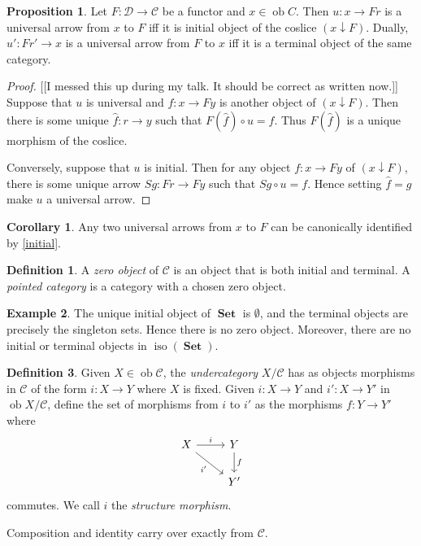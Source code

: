 \documentclass[10pt,letterpaper,cm]{nupset}
\theoremstyle{definition}
\newtheorem{definition}{Definition}
\newtheorem{exmp}[definition]{Example}
\theoremstyle{theorem}
\newtheorem{prop}[theorem]{Proposition}
\newtheorem{corollary}[theorem]{Corollary}
\theoremstyle{remark}
\newcommand{\1}{\mathbf{1}}
\renewcommand{\c}{\mathscr{C}}
\renewcommand{\d}{\mathscr{D}}
\newcommand{\0}{\vec 0}
\DeclareMathOperator{\ob}{ob}
\DeclareMathOperator{\iso}{iso}
\DeclareMathOperator{\set}{\mathbf{Set}}
\begin{document}
\begin{prop}
Let $F : \d \to \c$ be a functor and $x \in \ob C$. Then $u : x \to Fr$ is a universal arrow from $x$ to $F$ iff it is initial object of the coslice $(x \downarrow F)$. Dually, $u' : Fr' \to x$ is a universal arrow from $F$ to $x$  iff it is a terminal object of the same category.
\end{prop}
\begin{proof}{[[I messed this up during my talk. It should be correct as written now.]]}
Suppose that $u$ is universal and $f: x \to Fy$ is another object of $(x \downarrow F)$. Then there is some unique $\hat{f}: r \to y$ such that $F\left(\hat{f}\right) \circ u = f$. Thus $F\left(\hat{f}\right)$ is a unique morphism of the coslice.

\medskip

Conversely, suppose that $u$ is initial. Then for any object $f: x \to Fy$ of $(x \downarrow F)$, there is some unique arrow $Sg : Fr \to Fy$ such that $Sg \circ u = f$. Hence setting $\hat{f} = g$ make $u$ a universal arrow.
\end{proof}

\begin{corollary}
Any two universal arrows from $x$ to $F$ can be canonically identified by \cref{initial}.
\end{corollary}

\begin{definition}
A \textit{zero object} of $\c$ is an object that is both initial and terminal. A \textit{pointed category} is a category with a chosen zero object. 
\end{definition}

\begin{exmp}
The unique initial object of $\set$ is $\emptyset$, and the terminal objects are precisely the singleton sets. Hence there is no zero object. Moreover, there are no initial or terminal objects in $\iso(\set)$.
\end{exmp}

\begin{definition}
Given $X \in \ob \c$, the \textit{undercategory} ${X}/{\c}$ has as objects morphisms in $\c$ of the form $i : X \to Y$ where $X$ is fixed. Given $i: X \to Y$ and  $i' : X \to Y'$ in $\ob {X}/{\c}$, define the set of morphisms from $i$ to $i'$ as the morphisms $f: Y \to Y'$ where
\[ \begin{tikzcd}
X \arrow[r, "i"] \arrow[swap, dr,  " i' "] & Y \arrow[d, "f"] \\%
 & Y'
\end{tikzcd}
\]
commutes. We call $i$ the \textit{structure morphism}.

\medskip

 Composition and identity carry over exactly from $\c$.
\end{definition}
\end{document}
